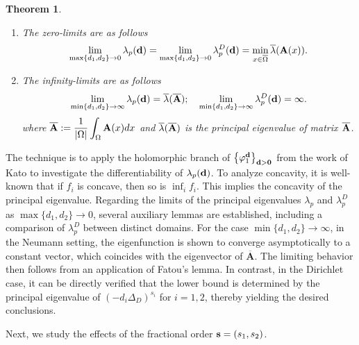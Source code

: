 \documentclass[a4paper,11pt]{amsart}
\newtheorem{theorem}{Theorem}
\theoremstyle{definition}
\def\O{\Omega}
\numberwithin{equation}{section}
\theoremstyle{definition}
\def\O{\Omega}
\begin{document}
\begin{theorem}
\begin{enumerate}[label=(\roman*)]
\item \label{lim0} The zero-limits are as follows
\begin{align*}
\lim\limits_{\max\{d_1,d_2\}\rightarrow 0} \lambda_p({\bf d})=\lim\limits_{\max\{d_1,d_2\}\rightarrow 0} \lambda_p^D({\bf d})=\min\limits_{x\in \overline{\O}}\overline{\lambda}({\bf A}(x)).
\end{align*}

\item \label{liminf} The infinity-limits are as follows
\begin{align*}
\lim\limits_{\min\{d_1,d_2\}\rightarrow \infty} \lambda_p({\bf d})=\overline{\lambda}({\bf \overline{A}});\quad\lim\limits_{\min\{d_1,d_2\}\rightarrow \infty} \lambda_p^D({\bf d})=\infty.
\end{align*}
where $\overline{\bf A}:=\dfrac{1}{|\O|}\displaystyle\int_{\O}{\bf A}(x)dx$ and  $\overline{\lambda}(\overline{\bf A})$ is the principal eigenvalue of matrix $\overline{\bf A}$.


\end{enumerate}


\end{theorem}

The technique is to apply the holomorphic branch of $\left\{\varphi^{\bf d}_1\right\}_{{\bf d}>{\bf 0}}$ from the work of Kato \cite{kato_1976} to investigate the differentiability of $\lambda_p({\bf d})$. To analyze concavity, it is well-known that if $f_i$ is concave, then so is $\inf_{i} f_i$. This implies the concavity of the principal eigenvalue. Regarding the limits of the principal eigenvalues $\lambda_p$ and $\lambda_p^D$ as $\max\{d_1,d_2\}\to 0$, several auxiliary lemmas are established, including a comparison of $\lambda_p^D$ between distinct domains. For the case $\min\{d_1,d_2\}\to \infty$, in the Neumann setting, the eigenfunction is shown to converge asymptotically to a constant vector, which coincides with the eigenvector of $\overline{\mathbf A}$. The limiting behavior then follows from an application of Fatou’s lemma. In contrast, in the Dirichlet case, it can be directly verified that the lower bound is determined by the principal eigenvalue of $(-d_i\Delta_D)^{s_i}$ for $i=1,2$, thereby yielding the desired conclusions.


Next, we study the effects of the fractional order ${\bf s}=(s_1,s_2)$.
\end{document}
